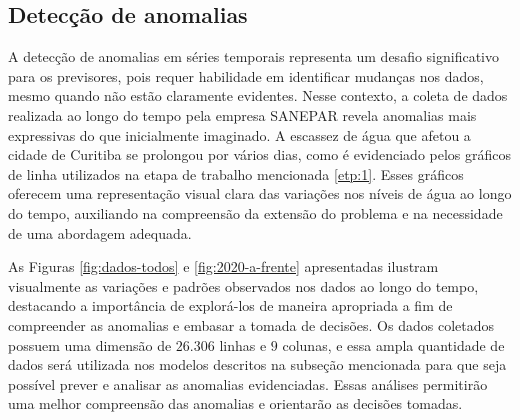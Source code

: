  

\subsection{Detec\c c\~ao de anomalias} \label{subsec:detec}



A detecção de anomalias em séries temporais representa um desafio significativo para os previsores, pois requer habilidade em identificar mudanças nos dados, mesmo quando não estão claramente evidentes. Nesse contexto, a coleta de dados realizada ao longo do tempo pela empresa SANEPAR revela anomalias mais expressivas do que inicialmente imaginado. A escassez de água que afetou a cidade de Curitiba se prolongou por vários dias, como é evidenciado pelos gráficos de linha utilizados na etapa de trabalho mencionada \eqref{etp:1}. Esses gráficos oferecem uma representação visual clara das variações nos níveis de água ao longo do tempo, auxiliando na compreensão da extensão do problema e na necessidade de uma abordagem adequada.

As Figuras \ref{fig:dados-todos} e \ref{fig:2020-a-frente} apresentadas ilustram visualmente as variações e padrões observados nos dados ao longo do tempo, destacando a importância de explorá-los de maneira apropriada a fim de compreender as anomalias e embasar a tomada de decisões. Os dados coletados possuem uma dimensão de $26.306$ linhas e $9$ colunas, e essa ampla quantidade de dados será utilizada nos modelos descritos na subseção mencionada para que seja possível prever e analisar as anomalias evidenciadas. Essas análises permitirão uma melhor compreensão das anomalias e orientarão as decisões tomadas.

